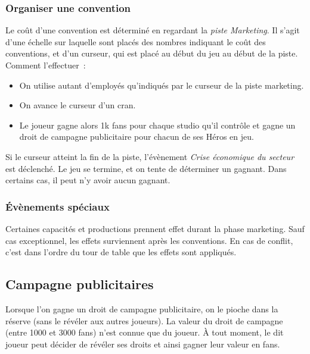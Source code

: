             \subsubsection{Organiser une convention}

                Le coût d'une convention est déterminé en regardant la \textit{piste Marketing}. Il s'agit
                d'une échelle sur laquelle sont placés des nombres indiquant le coût des conventions, et d'un
                curseur, qui est placé au début du jeu au début de la piste.
                \\
                Comment l'effectuer :
                    \begin{itemize}
                        \item On utilise autant d'employés qu'indiqués par le curseur de la piste marketing.
                        \item On avance le curseur d'un cran.
                        \item Le joueur gagne alors 1k fans pour chaque studio qu'il contrôle et gagne un droit de campagne publicitaire pour chacun de ses Héros en jeu.
                    \end{itemize}

                Si le curseur atteint la fin de la piste, l'évènement \textit{Crise économique du secteur} est déclenché.
                Le jeu se termine, et on tente de déterminer un gagnant. Dans certains cas, il peut n'y avoir aucun gagnant.

            \subsubsection{Évènements spéciaux}

                Certaines capacités et productions prennent effet durant la phase marketing.
                Sauf cas exceptionnel, les effets surviennent après les conventions.
                En cas de conflit, c'est dans l'ordre du tour de table que les effets sont appliqués.


        \subsection{Campagne publicitaires}

            Lorsque l'on gagne un droit de campagne publicitaire, on le pioche dans la réserve
            (sans le révéler aux autres joueurs). La valeur du droit de campagne (entre 1000 et 3000 fans)
            n'est connue que du joueur. À tout moment, le dit joueur peut décider de révéler ses
            droits et ainsi gagner leur valeur en fans.

